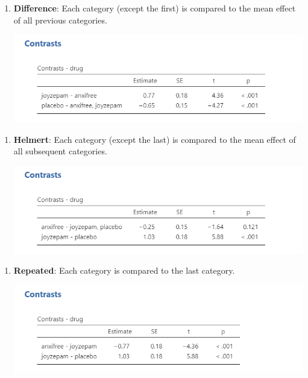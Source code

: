 \documentclass[
]{book}
\begin{document}
\begin{enumerate}
\def\labelenumi{\arabic{enumi}.}
\setcounter{enumi}{2}
\item
  \textbf{Difference}: Each category (except the first) is compared to the mean effect of all previous categories.

  \includegraphics{images/04_one-way-anova/contrasts_difference.png}
\end{enumerate}

\begin{enumerate}
\def\labelenumi{\arabic{enumi}.}
\setcounter{enumi}{3}
\item
  \textbf{Helmert}: Each category (except the last) is compared to the mean effect of all subsequent categories.

  \includegraphics{images/04_one-way-anova/contrasts_helmert.png}
\end{enumerate}

\begin{enumerate}
\def\labelenumi{\arabic{enumi}.}
\setcounter{enumi}{4}
\item
  \textbf{Repeated}: Each category is compared to the last category.

  \includegraphics{images/04_one-way-anova/contrasts_repeated.png}
\end{enumerate}
\end{document}
